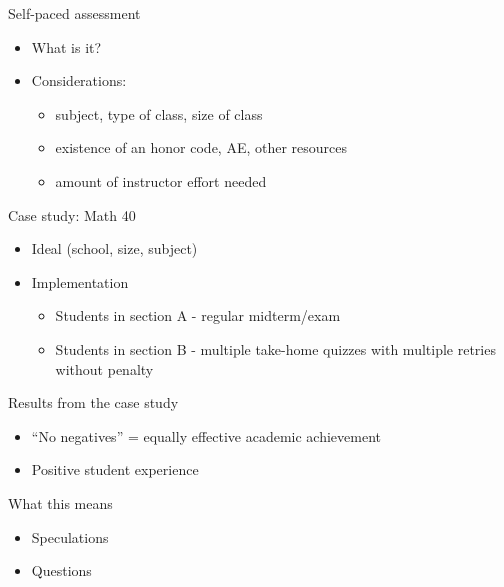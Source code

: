 \documentclass{beamer}
\begin{document}
\begin{frame}{Self-paced assessment}
  \begin{itemize}
    \item What is it?\pause
    \item Considerations:
    \begin{itemize}
      \item subject, type of class, size of class
      \item existence of an honor code, AE, other resources
      \item amount of instructor effort needed
    \end{itemize}
  \end{itemize}
\end{frame}
\begin{frame}{Case study: Math 40}
  \begin{itemize}
    \item Ideal (school, size, subject)
    \item Implementation
    \begin{itemize}
      \item Students in section A - regular midterm/exam
      \item Students in section B - multiple take-home quizzes with multiple retries without penalty
    \end{itemize}
  \end{itemize}
\end{frame}
\begin{frame}{Results from the case study}
  \begin{itemize}
    \item ``No negatives'' = equally effective academic achievement
    \item Positive student experience
  \end{itemize}
\end{frame}
\begin{frame}{What this means}
  \begin{itemize}
  \item Speculations
  \item Questions
  \end{itemize}
\end{frame}
\end{document}
